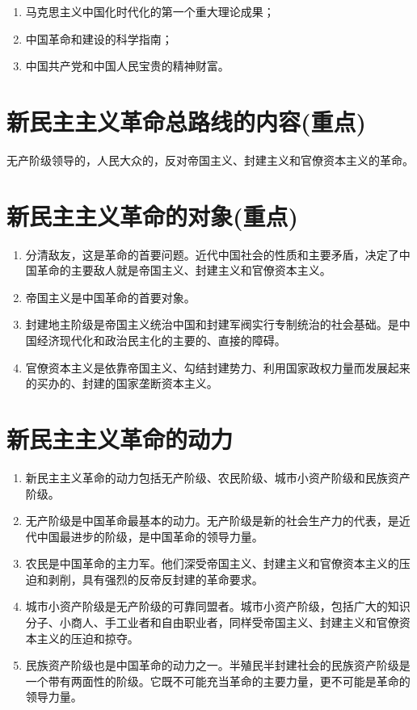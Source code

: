 \documentclass[12pt, a4paper, oneside]{ctexbook}
\begin{document}
\begin{enumerate}
\item 马克思主义中国化时代化的第一个重大理论成果；

\item 中国革命和建设的科学指南；

\item 中国共产党和中国人民宝贵的精神财富。
\end{enumerate}

\section{新民主主义革命总路线的内容(重点)}

无产阶级领导的，人民大众的，反对帝国主义、封建主义和官僚资本主义的革命。

\section{新民主主义革命的对象(重点)}

\begin{enumerate}
\item 分清敌友，这是革命的首要问题。近代中国社会的性质和主要矛盾，决定了中国革命的主要敌人就是帝国主义、封建主义和官僚资本主义。

\item 帝国主义是中国革命的首要对象。

\item 封建地主阶级是帝国主义统治中国和封建军阀实行专制统治的社会基础。是中国经济现代化和政治民主化的主要的、直接的障碍。

\item 官僚资本主义是依靠帝国主义、勾结封建势力、利用国家政权力量而发展起来的买办的、封建的国家垄断资本主义。
\end{enumerate}

\section{新民主主义革命的动力}

\begin{enumerate}
\item 新民主主义革命的动力包括无产阶级、农民阶级、城市小资产阶级和民族资产阶级。

\item 无产阶级是中国革命最基本的动力。无产阶级是新的社会生产力的代表，是近代中国最进步的阶级，是中国革命的领导力量。

\item 农民是中国革命的主力军。他们深受帝国主义、封建主义和官僚资本主义的压迫和剥削，具有强烈的反帝反封建的革命要求。

\item 城市小资产阶级是无产阶级的可靠同盟者。城市小资产阶级，包括广大的知识分子、小商人、手工业者和自由职业者，同样受帝国主义、封建主义和官僚资本主义的压迫和掠夺。

\item 民族资产阶级也是中国革命的动力之一。半殖民半封建社会的民族资产阶级是一个带有两面性的阶级。它既不可能充当革命的主要力量，更不可能是革命的领导力量。
\end{enumerate}
\end{document}
